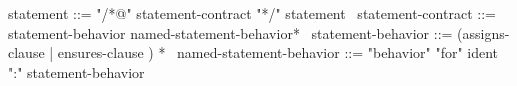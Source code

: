 \begin{syntax}
  statement ::= "/*@" statement-contract "*/" statement
  \
  statement-contract ::= statement-behavior named-statement-behavior*  
  \
  statement-behavior ::= (assigns-clause | ensures-clause ) * 
  \
  named-statement-behavior ::= "behavior" "for" ident ":" statement-behavior
\end{syntax}
